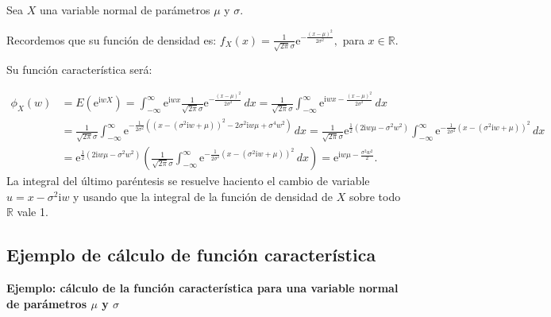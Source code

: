 \documentclass[]{book}
\begin{document}
Sea \(X\) una variable normal de parámetros \(\mu\) y \(\sigma\).

Recordemos que su función de densidad es: \(f_X(x)=\frac{1}{\sqrt{2\pi}\sigma}\mathrm{e}^{-\frac{(x-\mu)^2}{2\sigma^2}},\) para \(x\in \mathbb{R}\).

Su función característica será:

\[
\begin{array}{rl}
\phi_X (w) & =E\left(\mathrm{e}^{\mathrm{i}w X}\right)=\int_{-\infty}^\infty \mathrm{e}^{\mathrm{i}w x}\frac{1}{\sqrt{2\pi}\sigma}\mathrm{e}^{-\frac{(x-\mu)^2}{2\sigma^2}}\, dx = \frac{1}{\sqrt{2\pi}\sigma} \int_{-\infty}^\infty \mathrm{e}^{\mathrm{i}wx-\frac{(x-\mu)^2}{2\sigma^2}}\, dx \\  & =  \frac{1}{\sqrt{2\pi}\sigma} \int_{-\infty}^\infty \mathrm{e}^{-\frac{1}{2\sigma^2}\left((x-(\sigma^2 \mathrm{i}w+\mu))^2-2\sigma^2 \mathrm{i}w \mu+\sigma^4 w^2\right)}\, dx = \frac{1}{\sqrt{2\pi}\sigma} \mathrm{e}^{\frac{1}{2}(2 \mathrm{i}w \mu -\sigma^2 w^2)}\int_{-\infty}^\infty \mathrm{e}^{-\frac{1}{2\sigma^2}(x-(\sigma^2 \mathrm{i}w+\mu))^2}\, dx\\ &  = \mathrm{e}^{\frac{1}{2}(2 \mathrm{i}w \mu -\sigma^2 w^2)} \left( \frac{1}{\sqrt{2\pi}\sigma} \int_{-\infty}^\infty \mathrm{e}^{-\frac{1}{2\sigma^2}(x-(\sigma^2 \mathrm{i}w+\mu))^2}\, dx\right) =  \mathrm{e}^{ \mathrm{i}w \mu -\frac{\sigma^2 w^2}{2}}.
\end{array}
\]
La integral del último paréntesis se resuelve haciento el cambio de variable \(u=x-\sigma^2 \mathrm{i}w\) y usando que la integral de la función de densidad de \(X\) sobre todo \(\mathbb{R}\) vale 1.

\hypertarget{ejemplo-de-cuxe1lculo-de-funciuxf3n-caracteruxedstica-3}{%
\subsection{Ejemplo de cálculo de función característica}\label{ejemplo-de-cuxe1lculo-de-funciuxf3n-caracteruxedstica-3}}

\textbf{Ejemplo: cálculo de la función característica para una variable normal de parámetros \(\mu\) y \(\sigma\)}
\end{document}
